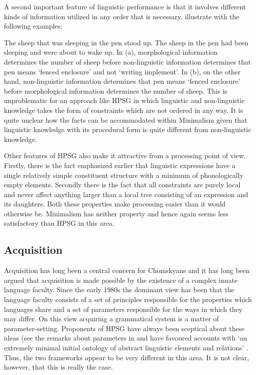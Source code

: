 \documentclass[output=paper]{langsci/langscibook}
\begin{document}
A second important feature of linguistic performance is that it involves different kinds of
information utilized in any order that is necessary. \citet{SW2011a} illustrate with the
following examples: 

\eal
\ex The sheep that was sleeping in the pen stood up.
\ex The sheep in the pen had been sleeping and were about to wake up.
\zl
In (a), morphological information determines the number of sheep before non-linguistic
information determines that pen means ‘fenced enclosure’ and not ‘writing implement’. In (b),
on the other hand, non-linguistic information determines that pen means ‘fenced enclosure’ before
morphological information determines the number of sheep. This is unproblematic for an approach like
HPSG in which linguistic and non-linguistic knowledge takes the form of constraints which are not
ordered in any way. It is quite unclear how the facts can be accommodated within Minimalism given
that linguistic knowledge with its procedural form is quite different from non-linguistic
knowledge. 

Other features of HPSG also make it attractive from a processing point of view. Firstly, there is
the fact emphasized earlier that linguistic expressions have a single relatively simple constituent
structure with a minimum of phonologically empty elements. Secondly there is the fact that all
constraints are purely local and never affect anything larger than a local tree consisting of an
expression and its daughters. Both these properties make processing easier than it would otherwise
be. Minimalism has neither property and hence again seems less satisfactory than HPSG in this area. 


\subsection{Acquisition}
\label{sec:min-restrictive}

Acquisition has long been a central concern for Chomskyans and it has long been argued that
acquisition is made possible by the existence of a complex innate language faculty. Since the early
1980s the dominant view has been that the language faculty consists of a set of principles
responsible for the properties which languages share and a set of parameters responsible for the ways in
which they may differ. On this view acquiring a grammatical system is a matter of
parameter-setting. Proponents of HPSG have always been sceptical about these ideas (see \eg the
remarks about parameters in  and have favoured accounts with ‘an extremely
minimal initial ontology of abstract linguistic elements and relations’ \citep[]{Green2011a}. Thus, the
two frameworks appear to be very different in this area. It is not clear, however, that this is
really the case.
\end{document}
